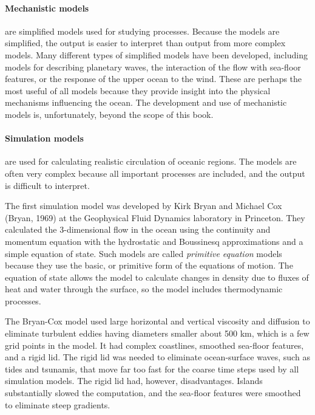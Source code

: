 \paragraph{Mechanistic models} are simplified models used for studying processes. Because the models are simplified, the
output is easier to interpret than output from more complex models. Many different
types of simplified models have been developed, including models for describing
planetary waves, the interaction of the flow with sea-floor features, or the
response of the upper ocean to the wind. These are perhaps the most useful of all
models because they provide insight into the physical mechanisms influencing the
ocean. The development and use of mechanistic models is, unfortunately, beyond the
scope of this book.

\paragraph{Simulation models} are used for calculating realistic circulation
of oceanic regions. The models are
often very complex because all important processes are included, and the output is
difficult to interpret. 

The first simulation model was developed by Kirk Bryan and Michael Cox (Bryan, 1969) at the Geophysical Fluid Dynamics laboratory in Princeton. They calculated the 3-dimensional flow in the ocean using the continuity and momentum equation with the hydrostatic and Boussinesq approximations and a simple equation of state. Such models are called \textit{primitive equation} models because they use the basic, or primitive form of the equations of motion. The equation of state allows the model to calculate changes in density due to fluxes of heat and water through the surface, so the model includes thermodynamic processes.

The Bryan-Cox model used large horizontal and vertical viscosity and diffusion to eliminate turbulent eddies having diameters smaller about 500 km, which is a few grid points in the model. It had complex coastlines, smoothed sea-floor features, and a rigid lid. The rigid lid was needed to eliminate ocean-surface waves, such as tides and tsunamis, that move far too fast for the coarse time steps used by all simulation models. The rigid lid had, however, disadvantages. Islands substantially slowed the computation, and the sea-floor features were smoothed to eliminate steep gradients.

